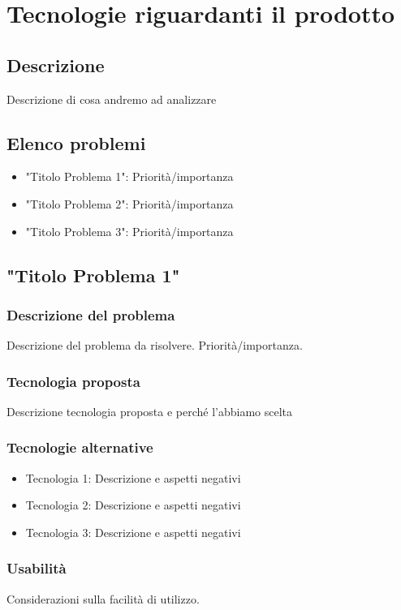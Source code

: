 \documentclass[./../Technology Baseline.tex]{subfiles}
\begin{document}
	
\chapter{Tecnologie riguardanti il prodotto }
\section{Descrizione}
Descrizione di cosa andremo ad analizzare

\section{Elenco problemi}
\begin{itemize}
	\item{"Titolo Problema 1": } Priorità/importanza
	\item{"Titolo Problema 2": } Priorità/importanza
	\item{"Titolo Problema 3": } Priorità/importanza
\end{itemize}


\section{"Titolo Problema 1"}

\subsection{Descrizione del problema}
Descrizione del problema da risolvere. Priorità/importanza.

\subsection{Tecnologia proposta}
Descrizione tecnologia proposta e perché l'abbiamo scelta

\subsection{Tecnologie alternative}
\begin{itemize}
	\item{Tecnologia 1: } Descrizione e aspetti negativi
	\item{Tecnologia 2: } Descrizione e aspetti negativi
	\item{Tecnologia 3: } Descrizione e aspetti negativi
\end{itemize}


\subsection{Usabilità}
Considerazioni sulla facilità di utilizzo.
\end{document}
